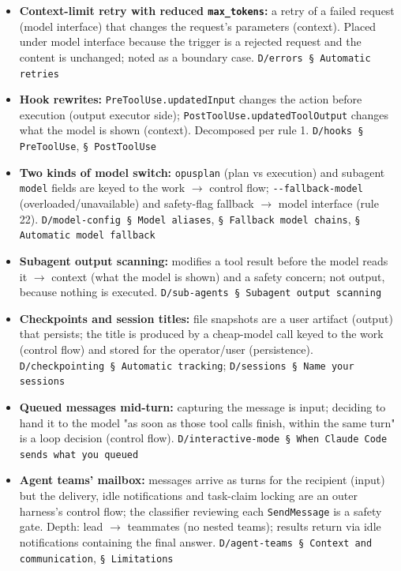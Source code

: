 \begin{itemize}
\item \textbf{Context-limit retry with reduced \texttt{max\_\allowbreak{}tokens}:} a retry of a failed request (model interface) that changes the request's parameters (context). Placed under model interface because the trigger is a rejected request and the content is unchanged; noted as a boundary case. \texttt{D/\allowbreak{}errors § Automatic retries}
\item \textbf{Hook rewrites:} \texttt{PreToolUse.\allowbreak{}updatedInput} changes the action before execution (output executor side); \texttt{PostToolUse.\allowbreak{}updatedToolOutput} changes what the model is shown (context). Decomposed per rule 1. \texttt{D/\allowbreak{}hooks § PreToolUse}, \texttt{§ PostToolUse}
\item \textbf{Two kinds of model switch:} \texttt{opusplan} (plan vs execution) and subagent \texttt{model} fields are keyed to the work $\rightarrow$ control flow; \texttt{-\allowbreak{}-\allowbreak{}fallback-\allowbreak{}model} (overloaded/unavailable) and safety-flag fallback $\rightarrow$ model interface (rule 22). \texttt{D/\allowbreak{}model-\allowbreak{}config § Model aliases}, \texttt{§ Fallback model chains}, \texttt{§ Automatic model fallback}
\item \textbf{Subagent output scanning:} modifies a tool result before the model reads it $\rightarrow$ context (what the model is shown) and a safety concern; not output, because nothing is executed. \texttt{D/\allowbreak{}sub-\allowbreak{}agents § Subagent output scanning}
\item \textbf{Checkpoints and session titles:} file snapshots are a user artifact (output) that persists; the title is produced by a cheap-model call keyed to the work (control flow) and stored for the operator/user (persistence). \texttt{D/\allowbreak{}checkpointing § Automatic tracking}; \texttt{D/\allowbreak{}sessions § Name your sessions}
\item \textbf{Queued messages mid-turn:} capturing the message is input; deciding to hand it to the model "as soon as those tool calls finish, within the same turn" is a loop decision (control flow). \texttt{D/\allowbreak{}interactive-\allowbreak{}mode § When Claude Code sends what you queued}
\item \textbf{Agent teams' mailbox:} messages arrive as turns for the recipient (input) but the delivery, idle notifications and task-claim locking are an outer harness's control flow; the classifier reviewing each \texttt{SendMessage} is a safety gate. Depth: lead $\rightarrow$ teammates (no nested teams); results return via idle notifications containing the final answer. \texttt{D/\allowbreak{}agent-\allowbreak{}teams § Context and communication}, \texttt{§ Limitations}

\end{itemize}
